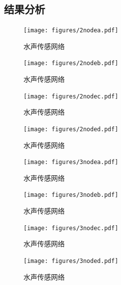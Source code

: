 \subsection{结果分析}


\begin{figure}[!ht]
	\centering
	\texttt{[image: figures/2nodea.pdf]}
	\caption{
		水声传感网络
	}
	\label{fig:example}
\end{figure}

\begin{figure}[!ht]
	\centering
	\texttt{[image: figures/2nodeb.pdf]}
	\caption{
		水声传感网络
	}
	\label{fig:example}
\end{figure}

\begin{figure}[!ht]
	\centering
	\texttt{[image: figures/2nodec.pdf]}
	\caption{
		水声传感网络
	}
	\label{fig:example}
\end{figure}

\begin{figure}[!ht]
	\centering
	\texttt{[image: figures/2noded.pdf]}
	\caption{
		水声传感网络
	}
	\label{fig:example}
\end{figure}


\begin{figure}[!ht]
	\centering
	\texttt{[image: figures/3nodea.pdf]}
	\caption{
		水声传感网络
	}
	\label{fig:example}
\end{figure}

\begin{figure}[!ht]
	\centering
	\texttt{[image: figures/3nodeb.pdf]}
	\caption{
		水声传感网络
	}
	\label{fig:example}
\end{figure}

\begin{figure}[!ht]
	\centering
	\texttt{[image: figures/3nodec.pdf]}
	\caption{
		水声传感网络
	}
	\label{fig:example}
\end{figure}

\begin{figure}[!ht]
	\centering
	\texttt{[image: figures/3noded.pdf]}
	\caption{
		水声传感网络
	}
	\label{fig:example}
\end{figure}

\endinput